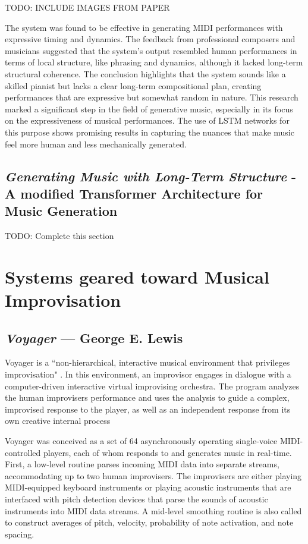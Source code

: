 \documentclass[../main.tex]{subfiles}
\begin{document}
TODO: INCLUDE IMAGES FROM PAPER

The system was found to be effective in generating MIDI performances with expressive timing and dynamics. The feedback from professional composers and musicians suggested that the system's output resembled human performances in terms of local structure, like phrasing and dynamics, although it lacked long-term structural coherence. The conclusion highlights that the system sounds like a skilled pianist but lacks a clear long-term compositional plan, creating performances that are expressive but somewhat random in nature. This research marked a significant step in the field of generative music, especially in its focus on the expressiveness of musical performances. The use of LSTM networks for this purpose shows promising results in capturing the nuances that make music feel more human and less mechanically generated.

\subsection{\textit{Generating Music with Long-Term Structure} - A modified Transformer Architecture for Music Generation}

TODO: Complete this section

\section{Systems geared toward Musical Improvisation}

\subsection{\textit{Voyager} — George E. Lewis}

Voyager is a ``non-hierarchical, interactive musical environment that privileges improvisation" \cite{Lewis:1}. In this environment, an improvisor engages in dialogue with a computer-driven interactive virtual improvising orchestra. The program analyzes the human improvisers performance and uses the analysis to guide a complex, improvised response to the player, as well as an independent response from its own creative internal process

Voyager was conceived as a set of 64 asynchronously operating single-voice MIDI-controlled players, each of whom responds to and generates music in real-time. First, a low-level routine parses incoming MIDI data into separate streams, accommodating up to two human improvisers. The improvisers are either playing MIDI-equipped keyboard instruments or playing acoustic instruments that are interfaced with pitch detection devices that parse the sounds of acoustic instruments into MIDI data streams. A mid-level smoothing routine is also called to construct averages of pitch, velocity, probability of note activation, and note spacing.
\end{document}

